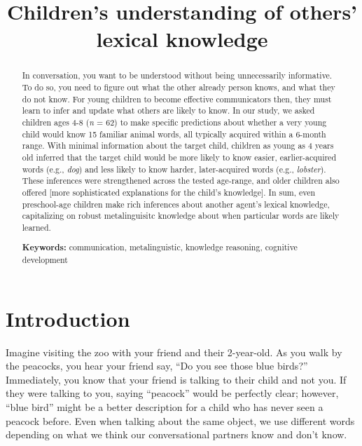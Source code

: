 \documentclass[10pt, letterpaper]{article}
\title{Children's understanding of others' lexical knowledge}
\begin{document}
\maketitle

\begin{abstract}
In conversation, you want to be understood without being unnecessarily
informative. To do so, you need to figure out what the other already
person knows, and what they do not know. For young children to become
effective communicators then, they must learn to infer and update what
others are likely to know. In our study, we asked children ages 4-8
(\emph{n} = 62) to make specific predictions about whether a very young
child would know 15 familiar animal words, all typically acquired within
a 6-month range. With minimal information about the target child,
children as young as 4 years old inferred that the target child would be
more likely to know easier, earlier-acquired words (e.g., \emph{dog})
and less likely to know harder, later-acquired words (e.g.,
\emph{lobster}). These inferences were strengthened across the tested
age-range, and older children also offered {[}more sophisticated
explanations for the child's knowledge{]}. In sum, even preschool-age
children make rich inferences about another agent's lexical knowledge,
capitalizing on robust metalinguisitc knowledge about when particular
words are likely learned.

\textbf{Keywords:}
communication, metalinguistic, knowledge reasoning, cognitive
development
\end{abstract}

\hypertarget{introduction}{%
\section{Introduction}\label{introduction}}

Imagine visiting the zoo with your friend and their 2-year-old. As you
walk by the peacocks, you hear your friend say, ``Do you see those blue
birds?'' Immediately, you know that your friend is talking to their
child and not you. If they were talking to you, saying ``peacock'' would
be perfectly clear; however, ``blue bird'' might be a better description
for a child who has never seen a peacock before. Even when talking about
the same object, we use different words depending on what we think our
conversational partners know and don't know.
\end{document}
